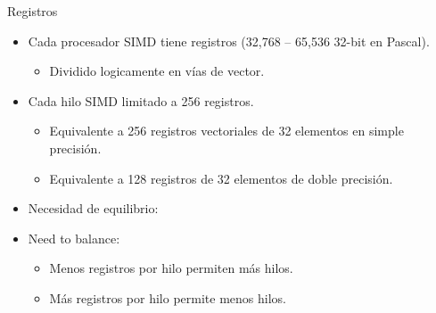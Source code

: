 \begin{frame}[t]{Registros}
\begin{itemize}
  \item Cada procesador SIMD tiene registros (32,768 -- 65,536 32-bit en Pascal).
    \begin{itemize}
      \item Dividido logicamente en vías de vector.
    \end{itemize}

  \item Cada hilo SIMD limitado a 256 registros.
    \begin{itemize}
      \item Equivalente a 256 registros vectoriales de 32 elementos en simple precisión.
      \item Equivalente a 128 registros de 32 elementos de doble precisión.
    \end{itemize}

  \item Necesidad de equilibrio:
  \item Need to balance:
    \begin{itemize}
      \item Menos registros por hilo permiten más hilos.
      \item Más registros por hilo permite menos hilos.
    \end{itemize}
\end{itemize}
\end{frame}

